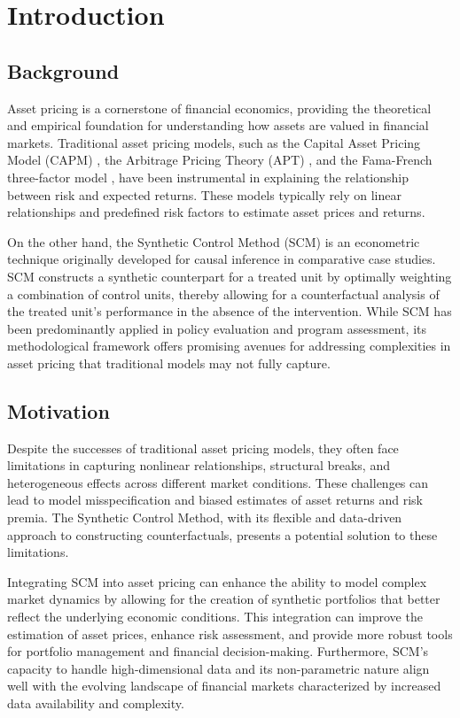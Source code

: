 \section{Introduction}

\subsection{Background}
Asset pricing is a cornerstone of financial economics, providing the theoretical and empirical foundation for understanding how assets are valued in financial markets. Traditional asset pricing models, such as the Capital Asset Pricing Model (CAPM) \cite{Sharpe1964}, the Arbitrage Pricing Theory (APT) \cite{Ross1976}, and the Fama-French three-factor model \cite{Fama1993}, have been instrumental in explaining the relationship between risk and expected returns. These models typically rely on linear relationships and predefined risk factors to estimate asset prices and returns.

On the other hand, the Synthetic Control Method (SCM) \cite{Abadie2010} is an econometric technique originally developed for causal inference in comparative case studies. SCM constructs a synthetic counterpart for a treated unit by optimally weighting a combination of control units, thereby allowing for a counterfactual analysis of the treated unit's performance in the absence of the intervention. While SCM has been predominantly applied in policy evaluation and program assessment, its methodological framework offers promising avenues for addressing complexities in asset pricing that traditional models may not fully capture.

\subsection{Motivation}
Despite the successes of traditional asset pricing models, they often face limitations in capturing nonlinear relationships, structural breaks, and heterogeneous effects across different market conditions. These challenges can lead to model misspecification and biased estimates of asset returns and risk premia. The Synthetic Control Method, with its flexible and data-driven approach to constructing counterfactuals, presents a potential solution to these limitations.

Integrating SCM into asset pricing can enhance the ability to model complex market dynamics by allowing for the creation of synthetic portfolios that better reflect the underlying economic conditions. This integration can improve the estimation of asset prices, enhance risk assessment, and provide more robust tools for portfolio management and financial decision-making. Furthermore, SCM's capacity to handle high-dimensional data and its non-parametric nature align well with the evolving landscape of financial markets characterized by increased data availability and complexity.

